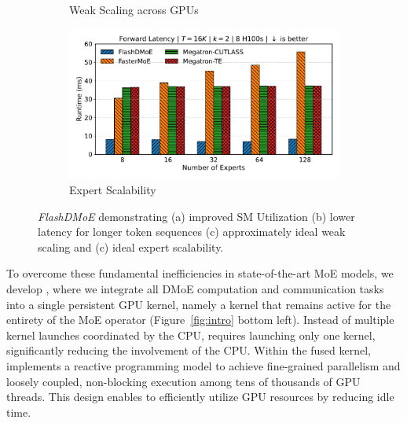 \begin{figure}[!h]
\begin{subfigure}{0.4\textwidth}
        \caption{Weak Scaling across GPUs}
        \label{sub:weak_scaling}
    \end{subfigure}
    \begin{subfigure}{0.4\textwidth}
        \centering
        \includegraphics[width=\linewidth, keepaspectratio]{figures/scaling_experts_8}
        \caption{Expert Scalability}
        \label{sub:experts}
    \end{subfigure}
    \caption{\emph{FlashDMoE} demonstrating
        (a) improved SM Utilization
        (b) lower latency for longer token sequences
        (c) approximately ideal weak scaling and
        (c) ideal expert scalability.
    }
    \label{fig:perf_contributions}
\end{figure}
To overcome these fundamental inefficiencies in state-of-the-art MoE models, we develop \sysname, where we
integrate all DMoE computation and communication tasks into a single persistent GPU kernel,
namely a kernel that remains active for the entirety of the MoE operator (Figure~\ref{fig:intro} bottom left).
Instead of multiple kernel launches coordinated by the CPU, \sysname requires launching only one kernel,
significantly reducing the involvement of the CPU\@.
Within the fused kernel, \sysname implements a reactive programming model to achieve
fine-grained parallelism and loosely coupled, non-blocking execution among tens of thousands of GPU threads.
This design enables \sysname to efficiently utilize GPU resources by reducing idle time.
